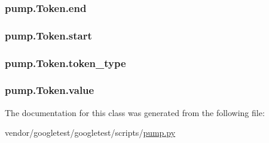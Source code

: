 \subsubsection[{\texorpdfstring{end}{end}}]{\setlength{\rightskip}{0pt plus 5cm}pump.\+Token.\+end}\hypertarget{classpump_1_1Token_abb88c0ece4274cfd974fd01d0468953c}{}\label{classpump_1_1Token_abb88c0ece4274cfd974fd01d0468953c}
\subsubsection[{\texorpdfstring{start}{start}}]{\setlength{\rightskip}{0pt plus 5cm}pump.\+Token.\+start}\hypertarget{classpump_1_1Token_a53e3333a770bc8773224a5af78bca5bb}{}\label{classpump_1_1Token_a53e3333a770bc8773224a5af78bca5bb}
\subsubsection[{\texorpdfstring{token\+\_\+type}{token_type}}]{\setlength{\rightskip}{0pt plus 5cm}pump.\+Token.\+token\+\_\+type}\hypertarget{classpump_1_1Token_aeac105b76f6af13c8c64ba0a94e37d90}{}\label{classpump_1_1Token_aeac105b76f6af13c8c64ba0a94e37d90}
\subsubsection[{\texorpdfstring{value}{value}}]{\setlength{\rightskip}{0pt plus 5cm}pump.\+Token.\+value}\hypertarget{classpump_1_1Token_a5b7ab395a380b775b2bf0a8b0abfda86}{}\label{classpump_1_1Token_a5b7ab395a380b775b2bf0a8b0abfda86}


The documentation for this class was generated from the following file\+:\begin{DoxyCompactItemize}
\item 
vendor/googletest/googletest/scripts/\hyperlink{pump_8py}{pump.\+py}\end{DoxyCompactItemize}
